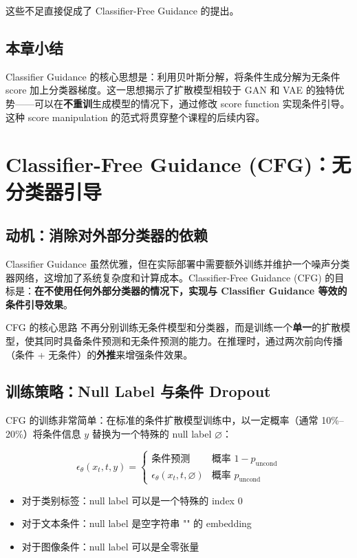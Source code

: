 \documentclass[a4paper]{article}
\begin{document}
这些不足直接促成了 Classifier-Free Guidance 的提出。

\subsection{本章小结}

Classifier Guidance 的核心思想是：利用贝叶斯分解，将条件生成分解为无条件 score 加上分类器梯度。这一思想揭示了扩散模型相较于 GAN 和 VAE 的独特优势——可以在\textbf{不重训}生成模型的情况下，通过修改 score function 实现条件引导。这种 score manipulation 的范式将贯穿整个课程的后续内容。

\newpage
\section{Classifier-Free Guidance (CFG)：无分类器引导}

\subsection{动机：消除对外部分类器的依赖}

Classifier Guidance 虽然优雅，但在实际部署中需要额外训练并维护一个噪声分类器网络，这增加了系统复杂度和计算成本。Classifier-Free Guidance (CFG) 的目标是：\textbf{在不使用任何外部分类器的情况下，实现与 Classifier Guidance 等效的条件引导效果}。

\begin{importantbox}{CFG 的核心思路}
不再分别训练无条件模型和分类器，而是训练一个\textbf{单一}的扩散模型，使其同时具备条件预测和无条件预测的能力。在推理时，通过两次前向传播（条件 + 无条件）的\textbf{外推}来增强条件效果。
\end{importantbox}

\subsection{训练策略：Null Label 与条件 Dropout}

CFG 的训练非常简单：在标准的条件扩散模型训练中，以一定概率（通常 10\%--20\%）将条件信息 $y$ 替换为一个特殊的 null label $\varnothing$：

$$
\epsilon_\theta(x_t, t, y) = \begin{cases}
\text{条件预测} & \text{概率 } 1-p_{\text{uncond}} \\
\epsilon_\theta(x_t, t, \varnothing) & \text{概率 } p_{\text{uncond}}
\end{cases}
$$

\begin{itemize}
    \item 对于类别标签：null label 可以是一个特殊的 index 0
    \item 对于文本条件：null label 是空字符串 ""  的 embedding
    \item 对于图像条件：null label 可以是全零张量
\end{itemize}
\end{document}
